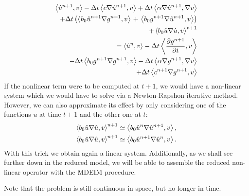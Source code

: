 \documentclass[../main.tex]{subfiles}
\newcommand{\inner}[2]{\left<#1, #2\right>}
\begin{document}
\begin{subequations}
    \label{eq:1d_fom_weak_formulation_homogeneous}
    \begin{align}
        \inner{\hat{u}^{n+1}}{v} - \Delta t\inner{c \grad \hat{u}^{n+1}}{v} + \Delta t\inner{\alpha \grad \hat{u}^{n+1}}{\grad v} \nonumber\\
        + \Delta t\left(\inner{b_0 \hat{u}^{n+1} \grad g^{n+1}}{v}\right. 
        + \left.\inner{b_0 g^{n+1} \grad \hat{u}^{n+1}}{v}\right) \nonumber\\
        + \inner{b_0 \hat{u} \grad \hat{u}}{v}^{n+1} \nonumber\\
        = 
        \inner{\hat{u}^{n}}{v} - \Delta t \inner{\frac{\partial g^{n+1}}{\partial t}}{v} \nonumber \\
        - \Delta t \inner{b_0 g^{n+1} \grad g^{n+1}}{v} - \Delta t \inner{\alpha \grad g^{n+1}}{\grad v} \nonumber\\ 
        + \Delta t \inner{c^{n+1} \grad g^{n+1}}{v}
    \end{align}
\end{subequations}
If the nonlinear term were to be computed at $t+1$, we would have a non-linear system which we would have to solve via a Newton-Rapshon iterative method.
However, we can also approximate its effect by only considering one of the functions $u$ at time $t+1$ and the other one at $t$:
\begin{align}
    \inner{b_0 \hat{u} \grad \hat{u}}{v}^{n+1} &\simeq \inner{b_0 \hat{u}^{n} \grad \hat{u}^{n+1}}{v}, \\
    \inner{b_0 \hat{u} \grad \hat{u}}{v}^{n+1} &\simeq \inner{b_0 \hat{u}^{n+1} \grad \hat{u}^{n}}{v}.
\end{align}
With this trick we obtain again a linear system.
Additionally, as we shall see further down in the reduced model, we will be able to assemble the reduced non-linear operator with the MDEIM procedure.

Note that the problem is still continuous in space, but no longer in time.
\end{document}
